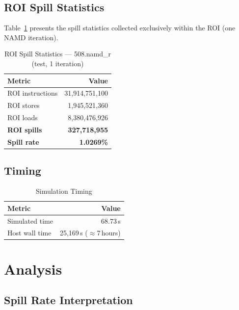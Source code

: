 \documentclass[conference]{IEEEtran}
\begin{document}
\subsection{ROI Spill Statistics}

Table~\ref{tab:roi} presents the spill statistics collected exclusively
within the ROI (one NAMD iteration).

\begin{table}[H]
\centering
\caption{ROI Spill Statistics — 508.namd\_r (test, 1 iteration)}
\label{tab:roi}
\begin{tabular}{lr}
\toprule
\textbf{Metric} & \textbf{Value} \\
\midrule
ROI instructions         & 31,914,751,100 \\
ROI stores               &  1,945,521,360 \\
ROI loads                &  8,380,476,926 \\
\midrule
\textbf{ROI spills}      & \textbf{327,718,955} \\
\textbf{Spill rate}      & \textbf{1.0269\%} \\
\bottomrule
\end{tabular}
\end{table}

\subsection{Timing}

\begin{table}[H]
\centering
\caption{Simulation Timing}
\label{tab:timing}
\begin{tabular}{lr}
\toprule
\textbf{Metric} & \textbf{Value} \\
\midrule
Simulated time  & 68.73\,s \\
Host wall time  & 25,169\,s ($\approx$7\,hours) \\
\bottomrule
\end{tabular}
\end{table}

\section{Analysis}

\subsection{Spill Rate Interpretation}
\end{document}
